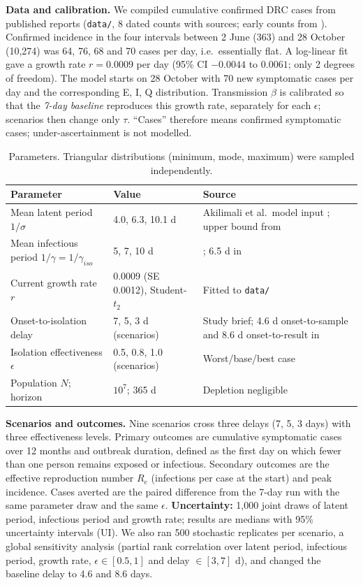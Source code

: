 \documentclass[10pt,a4paper]{article}
\begin{document}
\textbf{Data and calibration.} We compiled cumulative confirmed DRC cases from published reports (\texttt{data/}, 8 dated counts with sources; early counts from \cite{akem}). Confirmed incidence in the four intervals between 2 June (363) and 28 October (10,274) was 64, 76, 68 and 70 cases per day, i.e.\ essentially flat. A log-linear fit gave a growth rate $r=0.0009$ per day (95\% CI $-0.0044$ to $0.0061$; only 2 degrees of freedom). The model starts on 28 October with 70 new symptomatic cases per day and the corresponding E, I, Q distribution. Transmission $\beta$ is calibrated so that the \emph{7-day baseline} reproduces this growth rate, separately for each $\epsilon$; scenarios then change only $\tau$. ``Cases'' therefore means confirmed symptomatic cases; under-ascertainment is not modelled.

\begin{table}[h]
\centering\small
\caption{Parameters. Triangular distributions (minimum, mode, maximum) were sampled independently.}\label{tab:par}
\begin{tabular}{@{}llp{7.4cm}@{}}\toprule
Parameter & Value & Source \\\midrule
Mean latent period $1/\sigma$ & 4.0, 6.3, 10.1 d & Akilimali et al.\ model input \cite{akilimali}; upper bound from \cite{chowell}\\
Mean infectious period $1/\gamma=1/\gamma_{iso}$ & 5, 7, 10 d & \cite{akilimali}; 6.5 d in \cite{chowell}\\
Current growth rate $r$ & 0.0009 (SE 0.0012), Student-$t_2$ & Fitted to \texttt{data/}\\
Onset-to-isolation delay & 7, 5, 3 d (scenarios) & Study brief; 4.6 d onset-to-sample and 8.6 d onset-to-result in \cite{akilimali}\\
Isolation effectiveness $\epsilon$ & 0.5, 0.8, 1.0 (scenarios) & Worst/base/best case\\
Population $N$; horizon & $10^7$; 365 d & Depletion negligible\\\bottomrule
\end{tabular}
\end{table}

\textbf{Scenarios and outcomes.} Nine scenarios cross three delays (7, 5, 3 days) with three effectiveness levels. Primary outcomes are cumulative symptomatic cases over 12 months and outbreak duration, defined as the first day on which fewer than one person remains exposed or infectious. Secondary outcomes are the effective reproduction number $R_e$ (infections per case at the start) and peak incidence. Cases averted are the paired difference from the 7-day run with the same parameter draw and the same $\epsilon$. \textbf{Uncertainty:} 1,000 joint draws of latent period, infectious period and growth rate; results are medians with 95\% uncertainty intervals (UI). We also ran 500 stochastic replicates per scenario, a global sensitivity analysis (partial rank correlation over latent period, infectious period, growth rate, $\epsilon\in[0.5,1]$ and delay $\in[3,7]$ d), and changed the baseline delay to 4.6 and 8.6 days.
\end{document}
